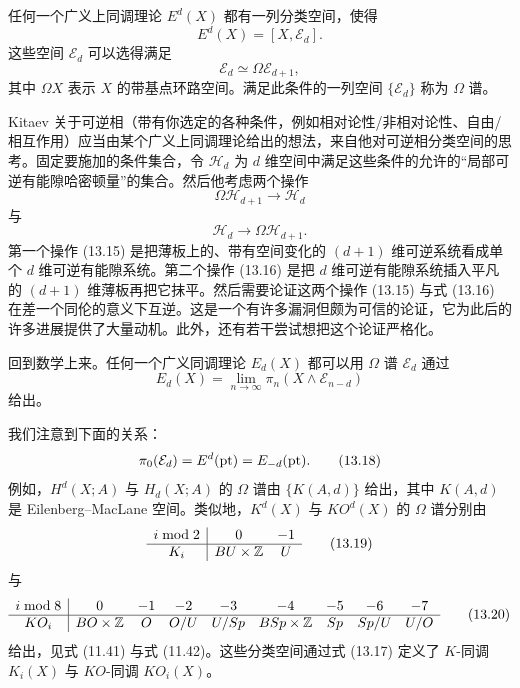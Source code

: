 任何一个广义上同调理论 $E^d(X)$ 都有一列分类空间，使得
\begin{equation}
E^d(X)=[X,\mathcal E_d]. \tag{13.13}
\end{equation}
这些空间 $\mathcal E_d$ 可以选得满足
\begin{equation}
\mathcal E_d\simeq\Omega\mathcal E_{d+1}, \tag{13.14}
\end{equation}
其中 $\Omega X$ 表示 $X$ 的带基点环路空间。满足此条件的一列空间 $\{\mathcal E_d\}$ 称为 $\Omega$ 谱。

Kitaev 关于可逆相（带有你选定的各种条件，例如相对论性/非相对论性、自由/相互作用）应当由某个广义上同调理论给出的想法，来自他对可逆相分类空间的思考。固定要施加的条件集合，令 $\mathcal H_d$ 为 $d$ 维空间中满足这些条件的允许的“局部可逆有能隙哈密顿量”的集合。然后他考虑两个操作
\begin{equation}
\Omega\mathcal H_{d+1}\to\mathcal H_d \tag{13.15}
\end{equation}
与
\begin{equation}
\mathcal H_d\to\Omega\mathcal H_{d+1}. \tag{13.16}
\end{equation}
第一个操作 (13.15) 是把薄板上的、带有空间变化的 $(d+1)$ 维可逆系统看成单个 $d$ 维可逆有能隙系统。第二个操作 (13.16) 是把 $d$ 维可逆有能隙系统插入平凡的 $(d+1)$ 维薄板再把它抹平。然后需要论证这两个操作 (13.15) 与式 (13.16) 在差一个同伦的意义下互逆。这是一个有许多漏洞但颇为可信的论证，它为此后的许多进展提供了大量动机。此外，还有若干尝试想把这个论证严格化。

回到数学上来。任何一个广义同调理论 $E_d(X)$ 都可以用 $\Omega$ 谱 $\mathcal E_d$ 通过
\begin{equation}
E_d(X)=\lim_{n\to\infty}\pi_n(X\wedge\mathcal E_{n-d}) \tag{13.17}
\end{equation}
给出。

我们注意到下面的关系：
\begin{equation}
\pi_0(\mathcal E_d)=E^d(\mathrm{pt})=E_{-d}(\mathrm{pt}). \tag{13.18}
\end{equation}
例如，$H^d(X;A)$ 与 $H_d(X;A)$ 的 $\Omega$ 谱由 $\{K(A,d)\}$ 给出，其中 $K(A,d)$ 是 Eilenberg--MacLane 空间。类似地，$K^d(X)$ 与 $KO^d(X)$ 的 $\Omega$ 谱分别由
\begin{equation}
\begin{array}{c|cc}
i\bmod 2 & 0 & -1\\ \hline
K_i & BU\times\mathbb{Z} & U
\end{array} \tag{13.19}
\end{equation}
与
\begin{equation}
\begin{array}{c|cccccccc}
i\bmod 8 & 0 & -1 & -2 & -3 & -4 & -5 & -6 & -7\\ \hline
KO_i & BO\times\mathbb{Z} & O & O/U & U/Sp & BSp\times\mathbb{Z} & Sp & Sp/U & U/O
\end{array} \tag{13.20}
\end{equation}
给出，见式 (11.41) 与式 (11.42)。这些分类空间通过式 (13.17) 定义了 $K$-同调 $K_i(X)$ 与 $KO$-同调 $KO_i(X)$。

